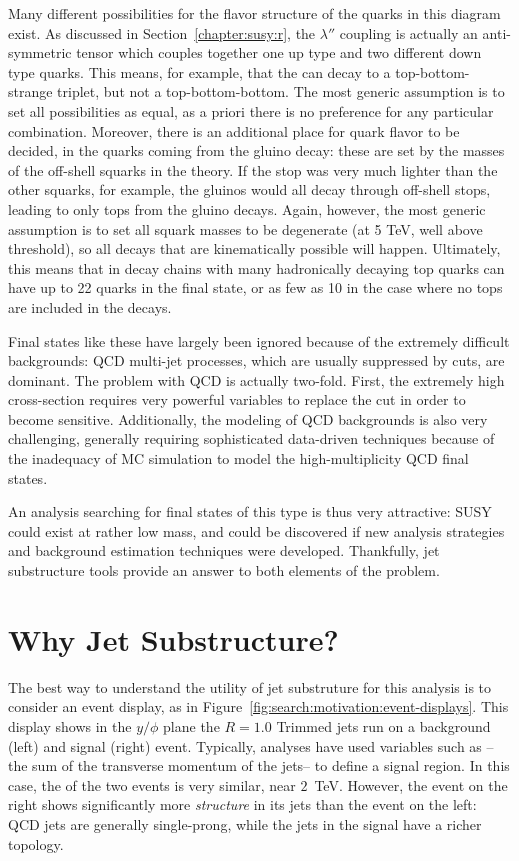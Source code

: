 Many different possibilities for the flavor structure of the quarks in this diagram exist. As discussed in Section~\ref{chapter:susy:r}, the  $\lambda''$ coupling is actually an anti-symmetric tensor which couples together one up type and two different down type quarks. This means, for example, that the \lsp can decay to a top-bottom-strange triplet, but not a top-bottom-bottom. The most generic assumption is to set all possibilities as equal, as a priori there is no preference for any particular combination. Moreover, there is an additional place for quark flavor to be decided, in the quarks coming from the gluino decay: these are set by the masses of the off-shell squarks in the theory. If the stop was very much lighter than the other squarks, for example, the gluinos would all decay through off-shell stops, leading to only tops from the gluino decays. Again, however, the most generic assumption is to set all squark masses to be degenerate (at 5 TeV, well above threshold), so all decays that are kinematically possible will happen. Ultimately, this means that in decay chains with many hadronically decaying top quarks can have up to 22 quarks in the final state, or as few as 10 in the case where no tops are included in the decays. 

Final states like these have largely been ignored because of the extremely difficult backgrounds: QCD multi-jet processes, which are usually suppressed by \met cuts, are dominant. The problem with QCD is actually two-fold. First, the extremely high cross-section requires very powerful variables to replace the \met cut in order to become sensitive. Additionally, the modeling of QCD backgrounds is also very challenging, generally requiring sophisticated data-driven techniques because of the inadequacy of MC simulation to model the high-multiplicity QCD final states.

An analysis searching for final states of this type is thus very attractive: SUSY could exist at rather low mass, and could be discovered if new analysis strategies and background estimation techniques were developed. Thankfully, jet substructure tools provide an answer to both elements of the problem.


\section{Why Jet Substructure?}

The best way to understand the utility of jet substruture for this analysis is to consider an event display, as in Figure~\ref{fig:search:motivation:event-displays}. This display shows in the $y/\phi$ plane the \antikt $R=1.0$ Trimmed jets run on a background (left) and signal (right) event. Typically, analyses have used variables such as \Ht-- the sum of the transverse momentum of the jets-- to define a signal region. In this case, the \Ht of the two events is very similar, near $2$~TeV. However, the event on the right shows significantly more \textit{structure} in its jets than the event on the left: QCD jets are generally single-prong, while the jets in the signal have a richer topology.  

